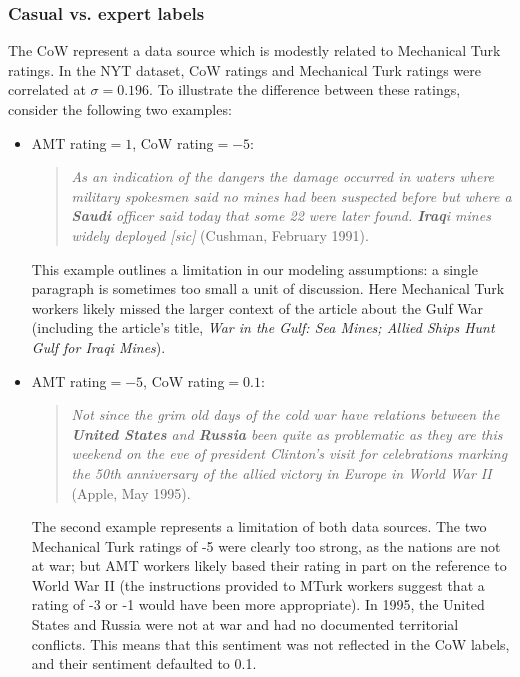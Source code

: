 \subsubsection{Casual vs. expert labels}
The CoW represent a data source which is modestly related to
Mechanical Turk ratings. In the NYT dataset, CoW ratings and
Mechanical Turk ratings were correlated at $\sigma=0.196$.  To
illustrate the difference between these ratings, consider the
following two examples:
\begin{itemize}
  \item AMT rating$= 1$, CoW rating$=-5$:
\begin{quote} 
  \emph{As an
    indication of the dangers the damage occurred in waters where
    military spokesmen said no mines had been suspected before but
    where a \textbf{Saudi} officer said today that some 22 were later
    found. \textbf{Iraq}i mines widely deployed [sic]} (Cushman, February 1991).
  \nocite{cushman:1991}
\end{quote}
This example outlines a limitation in our modeling
assumptions: a single paragraph is sometimes too small a unit of
discussion.  Here Mechanical Turk workers likely missed
the larger context of the article about the Gulf War (including the
article's title, \emph{War in the Gulf: Sea Mines; Allied Ships Hunt
  Gulf for Iraqi Mines}).
\item AMT rating$ = -5$, CoW rating$=0.1$: \begin{quote}\emph{Not since
    the grim old days of the cold war have relations between the
    \textbf{United States} and \textbf{Russia} been quite as problematic as they
    are this weekend on the eve of president Clinton's visit for
    celebrations marking the 50th anniversary of the allied victory in
    Europe in World War II} (Apple, May 1995). \nocite{apple:1995}
\end{quote}
The second example represents a limitation of both data sources.  The
two Mechanical Turk ratings of -5 were clearly too strong, as the
nations are not at war; but AMT workers likely based their rating in
part on the reference to World War II (the instructions provided to
MTurk workers suggest that a rating of -3 or -1 would have been more
appropriate).  In 1995, the United States and Russia were not at war
and had no documented territorial conflicts.  This means that this
sentiment was not reflected in the CoW labels, and their sentiment
defaulted to 0.1.
\end{itemize}

\label{section:experiments}

